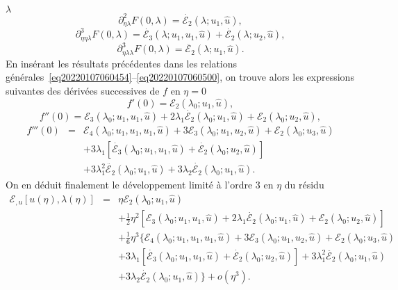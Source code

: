 \documentclass{article}
\begin{document}
$λ$
\begin{equation}
  \partial_{η  λ}^2 F (0, λ) = \dot{ℰ_2}
  (λ ; u_1, \hat{u}),
\end{equation}
\begin{equation}
  \partial_{η  η  λ}^3 F (0, λ) =
  \dot{ℰ_3} (λ ; u_1, u_1, \hat{u}) + \dot{ℰ_2}
  (λ ; u_2, \hat{u}),
\end{equation}
\begin{equation}
  \partial_{η  λ  λ}^3 F (0, λ) =
  \ddot{ℰ_2} (λ ; u_1, \hat{u}) .
\end{equation}
En insérant les résultats précédentes dans les relations
générales~\eqref{eq20220107060454}--\eqref{eq20220107060500}, on
trouve alors les expressions suivantes des dérivées successives de $f$
en $η = 0$
\begin{equation}
  f' (0) =ℰ_2 (λ_0 ; u_1, \hat{u}),
\end{equation}
\begin{equation}
  f'' (0) =ℰ_3 (λ_0 ; u_1, u_1, \hat{u}) + 2 λ_1
  \dot{ℰ_2} (λ_0 ; u_1, \hat{u}) +ℰ_2 (λ_0 ;
  u_2, \hat{u}),
\end{equation}
\begin{eqnarray}
  f''' (0) & = & ℰ_4 (λ_0 ; u_1, u_1, u_1, \hat{u}) +
  3ℰ_3 (λ_0 ; u_1, u_2, \hat{u}) +ℰ_2 (λ_0 ;
  u_3, \hat{u}) \nonumber\\
  &  &  + 3 λ_1  [\dot{ℰ_3} (λ_0 ; u_1, u_1,
  \hat{u}) + \dot{ℰ_2} (λ_0 ; u_2, \hat{u})] \nonumber\\
  &  &  + 3 λ_1^2  \ddot{ℰ_2} (λ_0 ; u_1,
  \hat{u}) + 3 λ_2  \dot{ℰ_2} (λ_0 ; u_1, \hat{u}) .
\end{eqnarray}
On en déduit finalement le développement limité à l'ordre 3 en
$η$ du résidu
\begin{eqnarray}
  ℰ_{, u} [u (η), λ (η)] & = & η ℰ_2
  (λ_0 ; u_1, \hat{u}) \nonumber\\
  &  &  + \tfrac{1}{2} η^2  [ℰ_3 (λ_0 ; u_1, u_1,
  \hat{u}) + 2 λ_1  \dot{ℰ_2} (λ_0 ; u_1, \hat{u})
  +ℰ_2 (λ_0 ; u_2, \hat{u})] \nonumber\\
  &  &  + \tfrac{1}{6} η^3  \{ ℰ_4 (λ_0 ; u_1,
  u_1, u_1, \hat{u}) + 3ℰ_3 (λ_0 ; u_1, u_2, \hat{u})
   +ℰ_2 (λ_0 ; u_3, \hat{u}) \nonumber\\
  &  &  + 3 λ_1  [\dot{ℰ_3} (λ_0 ; u_1, u_1,
  \hat{u}) + \dot{ℰ_2} (λ_0 ; u_2, \hat{u})] + 3 λ_1^2
  \ddot{ℰ_2} (λ_0 ; u_1, \hat{u}) \nonumber\\
  &  &   + 3 λ_2  \dot{ℰ_2} (λ_0 ;
  u_1, \hat{u}) \} + o (η^3) .  \label{eq20220107080901}
\end{eqnarray}
\end{document}

